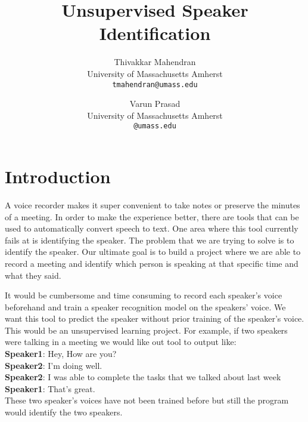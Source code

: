 \documentclass[10pt,twocolumn,letterpaper]{article}
\begin{document}
\title{Unsupervised Speaker Identification}

\author{Thivakkar Mahendran\\
University of Massachusetts Amherst\\
{\tt\small tmahendran@umass.edu}
\and
Varun Prasad\\
University of Massachusetts Amherst\\
{\tt\small @umass.edu}
}

\maketitle



\section{Introduction}

A voice recorder makes it super convenient to take notes or preserve the minutes of a meeting. In order to make the experience better, there are tools that can be used to automatically convert speech to text. One area where this tool currently fails at is identifying the speaker. The problem that we are trying to solve is to identify the speaker. Our ultimate goal is to build a project where we are able to record a meeting and identify which person is speaking at that specific time and what they said.

It would be cumbersome and time consuming to record each speaker’s voice beforehand and train a speaker recognition model on the speakers’ voice. We want this tool to predict the speaker without prior training of the speaker’s voice. This would be an unsupervised learning project. \hfill \break \break
For example, if two speakers were talking in a meeting we would like out tool to output like:
\\  {\bf Speaker1}: Hey, How are you? 
\\ {\bf Speaker2}: I’m doing well.
\\ {\bf Speaker2}: I was able to complete the tasks that we talked about last week
\\ {\bf Speaker1}: That’s great.
\\ These two speaker’s voices have not been trained before but still the program would identify the two speakers. 
\end{document}
